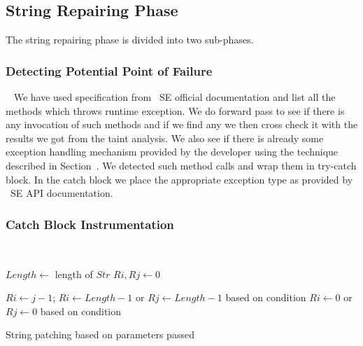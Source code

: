 \subsection{String Repairing Phase}
\label{subsec:stringReepairing}

The string repairing phase is divided into two sub-phases.

\subsubsection{Detecting Potential Point of Failure}
\label{subsub:detectingFailure}
~\newline
We have used specification from \java\ SE official documentation and list all
the methods which throws runtime exception. We do forward pass to see if there 
is any invocation of such methods and if we find any we then cross check it 
with the results we got from the taint analysis. We also see if there is already
some exception handling mechanism provided by the developer using the technique 
described in Section~\cite{subsec:callChainLookUp}. We detected such method calls
and wrap them in try-catch block. In the catch block we place the appropriate
exception type as provided by \java\ SE API documentation. 

\subsubsection{Catch Block Instrumentation}
\label{subsub:catchInstrumentation}
~\newline

\begin{algorithm}
\small
\DontPrintSemicolon
{}
\Begin
{
	$Length \longleftarrow$ length of $Str$\;
	{
		$Ri, Rj \longleftarrow 0$\;
	}
	\Else
	{
		{
			$Ri \longleftarrow j - 1$;
		}
		{
			$Ri \longleftarrow Length - 1$ or $Rj \longleftarrow Length - 1$ based on
			condition\; 
		}
		{
			$Ri \longleftarrow 0$ or $Rj \longleftarrow 0$ based on
			condition\; 
		}
		
		
	}	

}
\caption{String patching based on parameters passed}
\label{algo:stringPatchParametr}
\end{algorithm}